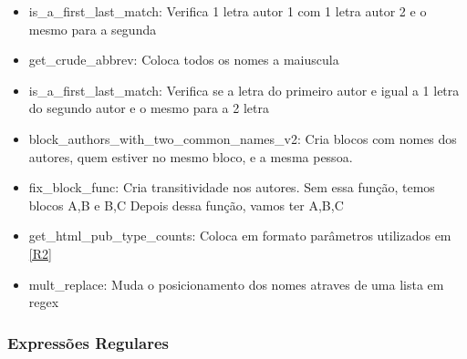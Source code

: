 \documentclass[11pt,a4paper]{report}
\begin{document}
\begin{itemize}
    \item is\_a\_first\_last\_match: Verifica 1 letra autor 1 com 1 letra autor 2 e o mesmo para a segunda
    \item get\_crude\_abbrev: Coloca todos os nomes a maiuscula
    \item is\_a\_first\_last\_match: Verifica se a letra do primeiro autor e igual a 1 letra do segundo autor e o mesmo para a 2 letra  
    \item block\_authors\_with\_two\_common\_names\_v2: Cria blocos com nomes dos autores, quem estiver no mesmo bloco, e a mesma pessoa.
    \item fix\_block\_func: Cria transitividade nos autores.  Sem essa função, temos blocos {A,B} e {B,C} Depois dessa função, vamos ter {A,B,C}
    \item get\_html\_pub\_type\_counts: Coloca  em formato \htlm parâmetros utilizados em \ref{R2}
    \item mult\_replace: Muda o posicionamento dos nomes atraves de uma lista em regex
    
    
\end{itemize}
\newpage
\subsubsection{Expressões Regulares}
\end{document}
